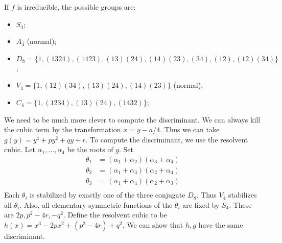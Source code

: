 \documentclass[10pt, twoside]{article}
\begin{document}
        If $f$ is irreducible, the possible groups are: \begin{itemize} \item
            $S_4$; \item $A_4$ (normal); \item $D_8 = \{1, (1324), (1423),
            (13)(24), (14)(23), (34), (12), (12)(34) \}$; \item $V_4 = \{ 1,
        (12)(34), (13)(24), (14)(23) \}$ (normal); \item $C_4 = \{1, (1234),
        (13)(24), (1432)\}$; \end{itemize}

        We need to be much more clever to compute the discriminant. We can
        always kill the cubic term by the transformation $x = y-a/4$. Thus we
        can take $g(y) = y^4 + py^2 + qy + r$. To compute the discriminant, we
        use the resolvent cubic. Let $\alpha_1, \ldots, \alpha_4$ be the roots
        of $g$. Set \begin{align*} \theta_1 &= (\alpha_1 + \alpha_2)(\alpha_3 +
        \alpha_4) \\ \theta_2 &= (\alpha_1 + \alpha_3)(\alpha_2 + \alpha_4) \\
    \theta_3 &= (\alpha_1 + \alpha_4)(\alpha_2 + \alpha_3) \\ \end{align*} Each
    $\theta_i$ is stabilized by exactly one of the three conjugate $D_8$. Thus
    $V_4$ stabilizes all $\theta_i$. Also, all elementary symmetric functions
    of the $\theta_i$ are fixed by $S_4$. These are $2p, p^2-4r, -q^2$. Define
    the resolvent cubic to be $h(x) = x^3 - 2px^2 + (p^2-4r) + q^2$. We can
    show that $h,g$ have the same discriminant.
\end{document}
